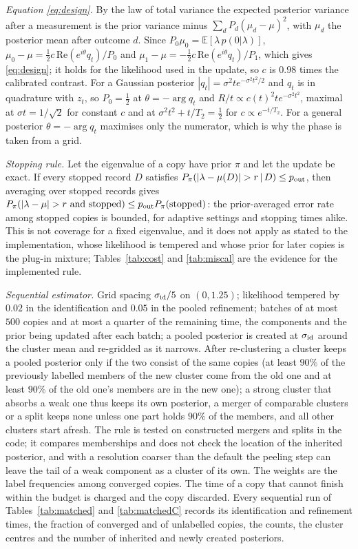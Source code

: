 \documentclass[journal]{IEEEtran}
\begin{document}
\emph{Equation \eqref{eq:design}.} By the law of total variance the expected posterior variance after a measurement is the prior variance minus $\sum_dP_d(\mu_d-\mu)^2$, with $\mu_d$ the posterior mean after outcome $d$. Since $P_0\mu_0=\mathbb E[\lambda\,p(0|\lambda)]$, $\mu_0-\mu=\tfrac12c\,\mathrm{Re}(e^{i\theta}q_t)/P_0$ and $\mu_1-\mu=-\tfrac12c\,\mathrm{Re}(e^{i\theta}q_t)/P_1$, which gives \eqref{eq:design}; it holds for the likelihood used in the update, so $c$ is $0.98$ times the calibrated contrast. For a Gaussian posterior $|q_t|=\sigma^2te^{-\sigma^2t^2/2}$ and $q_t$ is in quadrature with $z_t$, so $P_0=\tfrac12$ at $\theta=-\arg q_t$ and $R/t\propto c(t)^2te^{-\sigma^2t^2}$, maximal at $\sigma t=1/\sqrt2$ for constant $c$ and at $\sigma^2t^2+t/T_2=\tfrac12$ for $c\propto e^{-t/T_2}$. For a general posterior $\theta=-\arg q_t$ maximises only the numerator, which is why the phase is taken from a grid.

\emph{Stopping rule.} Let the eigenvalue of a copy have prior $\pi$ and let the update be exact. If every stopped record $D$ satisfies $P_\pi(|\lambda-\mu(D)|>r\,|\,D)\le p_{\rm out}$, then averaging over stopped records gives $P_\pi(|\lambda-\mu|>r\ \mathrm{and\ stopped})\le p_{\rm out}P_\pi(\mathrm{stopped})$: the prior-averaged error rate among stopped copies is bounded, for adaptive settings and stopping times alike. This is not coverage for a fixed eigenvalue, and it does not apply as stated to the implementation, whose likelihood is tempered and whose prior for later copies is the plug-in mixture; Tables~\ref{tab:cost} and \ref{tab:miscal} are the evidence for the implemented rule.

\emph{Sequential estimator.} Grid spacing $\sigma_{\rm id}/5$ on $(0,1.25)$; likelihood tempered by $0.02$ in the identification and $0.05$ in the pooled refinement; batches of at most $500$ copies and at most a quarter of the remaining time, the components and the prior being updated after each batch; a pooled posterior is created at $\sigma_{\rm id}$ around the cluster mean and re-gridded as it narrows. After re-clustering a cluster keeps a pooled posterior only if the two consist of the same copies (at least $90\%$ of the previously labelled members of the new cluster come from the old one and at least $90\%$ of the old one's members are in the new one); a strong cluster that absorbs a weak one thus keeps its own posterior, a merger of comparable clusters or a split keeps none unless one part holds $90\%$ of the members, and all other clusters start afresh. The rule is tested on constructed mergers and splits in the code; it compares memberships and does not check the location of the inherited posterior, and with a resolution coarser than the default the peeling step can leave the tail of a weak component as a cluster of its own. The weights are the label frequencies among converged copies. The time of a copy that cannot finish within the budget is charged and the copy discarded. Every sequential run of Tables~\ref{tab:matched} and \ref{tab:matchedC} records its identification and refinement times, the fraction of converged and of unlabelled copies, the counts, the cluster centres and the number of inherited and newly created posteriors.
\end{document}
